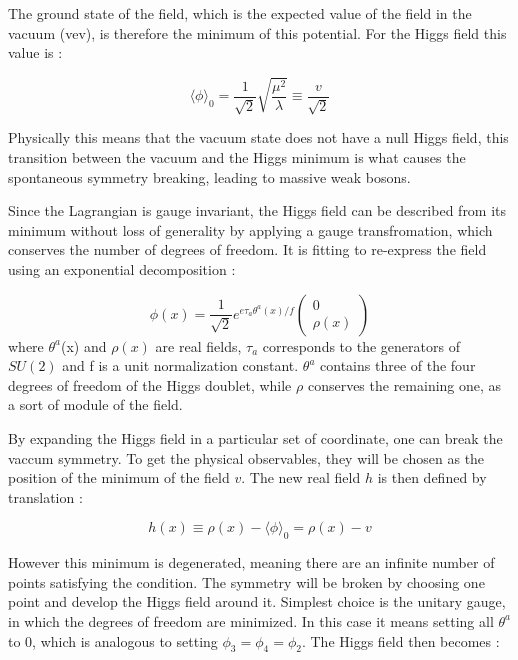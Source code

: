 The ground state of the field, which is the expected value of the field in the vacuum (vev), is therefore the minimum of this potential. For the Higgs field this value is :

\begin{equation}
    \langle \phi \rangle_0 = \frac{1}{\sqrt{2}}\sqrt{\frac{\mu^2}{\lambda}} \equiv \frac{v}{\sqrt{2}}
\end{equation}

Physically this means that the vacuum state does not have a null Higgs field, this transition between the vacuum and the Higgs minimum is what causes the spontaneous symmetry breaking, leading to massive weak bosons.

Since the Lagrangian is gauge invariant, the Higgs field can be described from its minimum without loss of generality by applying a gauge transfromation, which conserves the number of degrees of freedom. It is fitting to re-express the field using an exponential decomposition :

\begin{equation}
    \phi(x) = \frac{1}{\sqrt{2}}e^{e\tau_a \theta^a (x) / f} \begin{pmatrix} 0 \\ \rho(x) \end{pmatrix}
\end{equation}
where $\theta^a$(x) and $\rho(x)$ are real fields, $\tau_a$ corresponds to the generators of $SU(2)$ and f is a unit normalization constant. $\theta^a$ contains three of the four degrees of freedom of the Higgs doublet, while $\rho$ conserves the remaining one, as a sort of module of the field.\newline

By expanding the Higgs field in a particular set of coordinate, one can break the vaccum symmetry. To get the physical observables, they will be chosen as the position of the minimum of the field $v$. The new real field $h$ is then defined by translation :

\begin{equation}
    h(x) \equiv \rho (x) - \langle \phi \rangle_0 = \rho(x) - v
\end{equation}

However this minimum is degenerated, meaning there are an infinite number of points satisfying the condition. The symmetry will be broken by choosing one point and develop the Higgs field around it. Simplest choice is the unitary gauge, in which the degrees of freedom are minimized. In this case it means setting all $\theta^a$ to 0, which is analogous to setting $\phi_3 = \phi_4 = \phi_2$. The Higgs field then becomes :

